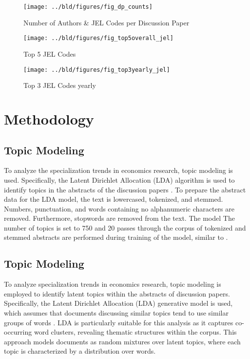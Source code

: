 \documentclass[11pt, a4paper, leqno]{article}
\begin{document}
\begin{figure}
    \centering
    \texttt{[image: ../bld/figures/fig\_dp\_counts]}
    \caption{Number of Authors \& JEL Codes per Discussion Paper}
    \label{fig:dp_counts}
\end{figure}

\begin{figure}
    \centering
    \texttt{[image: ../bld/figures/fig\_top5overall\_jel]}
    \caption{Top 5 JEL Codes}
    \label{fig:top5overall_jel}
\end{figure}

\begin{figure}
    \centering
    \texttt{[image: ../bld/figures/fig\_top3yearly\_jel]}
    \caption{Top 3 JEL Codes yearly}
    \label{fig:top3yearly_jel}
\end{figure}

\section{Methodology}

\subsection{Topic Modeling}
To analyze the specialization trends in economics research, topic modeling is used.
Specifically, the Latent Dirichlet Allocation (LDA) algorithm is used to identify topics in the abstracts of the discussion papers \cite{blei2003}.
To prepare the abstract data for the LDA model, the text is lowercased, tokenized, and stemmed.
Numbers, punctuation, and words containing no alphanumeric characters are removed.
Furthermore, stopwords are removed from the text.
The model
The number of topics is set to 750 and 20 passes through the corpus of tokenized and stemmed abstracts are performed during training of the model, similar to \cite{galiani2023a}.

\subsection{Topic Modeling}

To analyze specialization trends in economics research, topic modeling is employed to identify latent topics within the abstracts of discussion papers.
Specifically, the Latent Dirichlet Allocation (LDA) generative model is used, which assumes that documents discussing similar topics tend to use similar groups of words \cite{blei2003}.
LDA is particularly suitable for this analysis as it captures co-occurring word clusters, revealing thematic structures within the corpus.
This approach models documents as random mixtures over latent topics, where each topic is characterized by a distribution over words.
\end{document}
